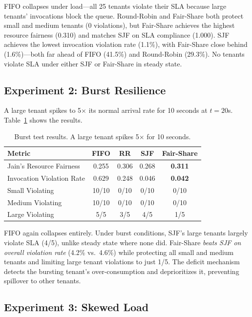 \documentclass[runningheads]{llncs}
\begin{document}
FIFO collapses under load---all 25 tenants violate their SLA because large tenants' invocations block the queue. Round-Robin and Fair-Share both protect small and medium tenants (0 violations), but Fair-Share achieves the highest resource fairness (0.310) and matches SJF on SLA compliance (1.000). SJF achieves the lowest invocation violation rate (1.1\%), with Fair-Share close behind (1.6\%)---both far ahead of FIFO (41.5\%) and Round-Robin (29.3\%). No tenants violate SLA under either SJF or Fair-Share in steady state.

\subsection{Experiment 2: Burst Resilience}

A large tenant spikes to 5$\times$ its normal arrival rate for 10 seconds at $t=20$s. Table~\ref{tab:burst} shows the results.

\begin{table}[!ht]
\centering
\caption{Burst test results. A large tenant spikes 5$\times$ for 10 seconds.}\label{tab:burst}
\small
\begin{tabular}{@{}lcccc@{}}
\toprule
\textbf{Metric} & \textbf{FIFO} & \textbf{RR} & \textbf{SJF} & \textbf{Fair-Share} \\
\midrule
Jain's Resource Fairness & 0.255 & 0.306 & 0.268 & \textbf{0.311} \\
Invocation Violation Rate & 0.629 & 0.248 & 0.046 & \textbf{0.042} \\
\midrule
Small Violating & 10/10 & 0/10 & 0/10 & 0/10 \\
Medium Violating & 10/10 & 0/10 & 0/10 & 0/10 \\
Large Violating & 5/5 & 3/5 & 4/5 & 1/5 \\
\bottomrule
\end{tabular}
\end{table}

FIFO again collapses entirely. Under burst conditions, SJF's large tenants largely violate SLA (4/5), unlike steady state where none did. Fair-Share \emph{beats SJF on overall violation rate} (4.2\% vs.\ 4.6\%) while protecting all small and medium tenants and limiting large tenant violations to just 1/5. The deficit mechanism detects the bursting tenant's over-consumption and deprioritizes it, preventing spillover to other tenants.

\subsection{Experiment 3: Skewed Load}
\end{document}
